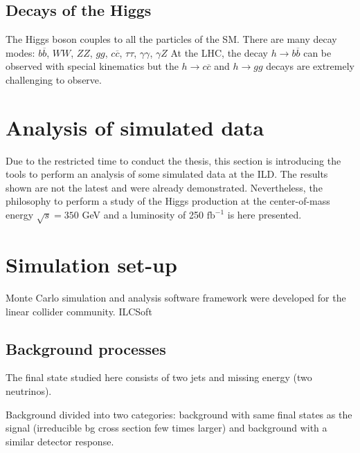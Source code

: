   \subsection{Decays of the Higgs}

  The Higgs boson couples to all the particles of the SM.
  There are many decay modes: $b\overline{b}$, $WW$, $ZZ$, $gg$, $c\overline{c}$, $\tau \tau$, $\gamma \gamma$, $\gamma Z$
  At the LHC, the decay $h \rightarrow b\overline{b}$ can be observed with special kinematics but the $h \rightarrow c \overline{c}$ and $h \rightarrow gg$ decays are extremely challenging to observe.

  \section{Analysis of simulated data}
  
    Due to the restricted time to conduct the thesis, this section is introducing the tools to perform an analysis of some simulated data at the ILD. 
    The results shown are not the latest and were already demonstrated. 
    Nevertheless, the philosophy to perform a study of the Higgs production at the center-of-mass energy $\sqrt{s} = 350$ GeV and a luminosity of 250 $\text{fb}^{-1}$ is here presented.
  
  \section{Simulation set-up}  
  
    Monte Carlo simulation and analysis software framework were developed for the linear collider community.
    ILCSoft

  \subsection{Background processes}
  
    The final state studied here consists of two jets and missing energy (two neutrinos). 
    

   Background divided into two categories: background with same final states as the signal (irreducible bg cross section few times larger) and background with a similar detector response.
   
